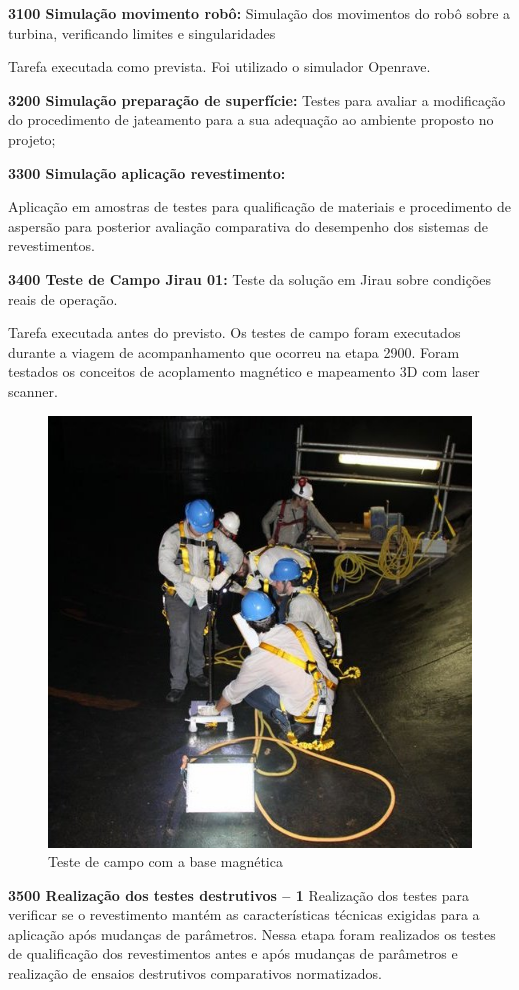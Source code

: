 \noindent
\textbf{3100 Simulação movimento robô:} 
Simulação dos movimentos do robô sobre a turbina, verificando limites e singularidades

Tarefa executada como prevista. Foi utilizado o simulador Openrave.  

\noindent
\textbf{3200 Simulação preparação de superfície:}
Testes para avaliar a modificação do procedimento de jateamento para a sua adequação ao ambiente proposto no projeto;

\noindent
\textbf{3300 Simulação aplicação revestimento:}

Aplicação em amostras de testes para qualificação de materiais e procedimento de aspersão para posterior avaliação comparativa do desempenho dos sistemas de revestimentos.


\noindent
\textbf{3400 Teste de Campo Jirau 01:} Teste da solução  em Jirau sobre
condições reais de operação.

Tarefa executada antes do previsto. Os testes de campo foram executados durante
a viagem de acompanhamento que ocorreu na etapa 2900. Foram testados os
conceitos de acoplamento magnético e mapeamento 3D com laser scanner.
\begin{figure}
\centering
\includegraphics[width=0.6\columnwidth]{figs/base}
\caption{Teste de campo com a base  magnética}
\end{figure}

\noindent
\textbf{3500 Realização dos testes destrutivos – 1}
Realização dos testes para verificar se o revestimento mantém as 
características técnicas exigidas para a aplicação após mudanças de parâmetros. Nessa etapa foram realizados os testes de qualificação dos revestimentos antes e após mudanças de parâmetros e realização de ensaios destrutivos comparativos normatizados. 

